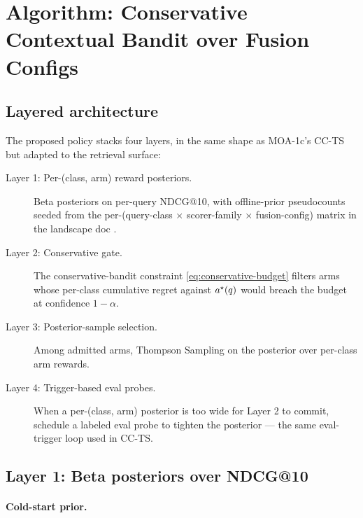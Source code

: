 \section{Algorithm: Conservative Contextual Bandit over Fusion Configs}
\label{sec:algorithm}


\subsection{Layered architecture}

The proposed policy stacks four layers, in the same shape as MOA-1c's
CC-TS but adapted to the retrieval surface:

\begin{description}
  \item[Layer 1: Per-(class, arm) reward posteriors.] Beta posteriors
        on per-query NDCG@10, with offline-prior pseudocounts seeded
        from the per-(query-class $\times$ scorer-family $\times$
        fusion-config) matrix in the landscape doc
        \cite{blackrim_ijl0_landscape}.
  \item[Layer 2: Conservative gate.] The conservative-bandit constraint
        \cref{eq:conservative-budget} filters arms whose per-class
        cumulative regret against $a^\star(q)$ would breach
        the budget at confidence $1 - \alpha$.
  \item[Layer 3: Posterior-sample selection.] Among admitted arms,
        Thompson Sampling \cite{russo2018tutorial} on the posterior over
        per-class arm rewards.
  \item[Layer 4: Trigger-based eval probes.] When a per-(class, arm)
        posterior is too wide for Layer 2 to commit, schedule a labeled
        eval probe to tighten the posterior --- the same eval-trigger
        loop used in CC-TS.
\end{description}

\subsection{Layer 1: Beta posteriors over NDCG@10}


\paragraph{Cold-start prior.}

